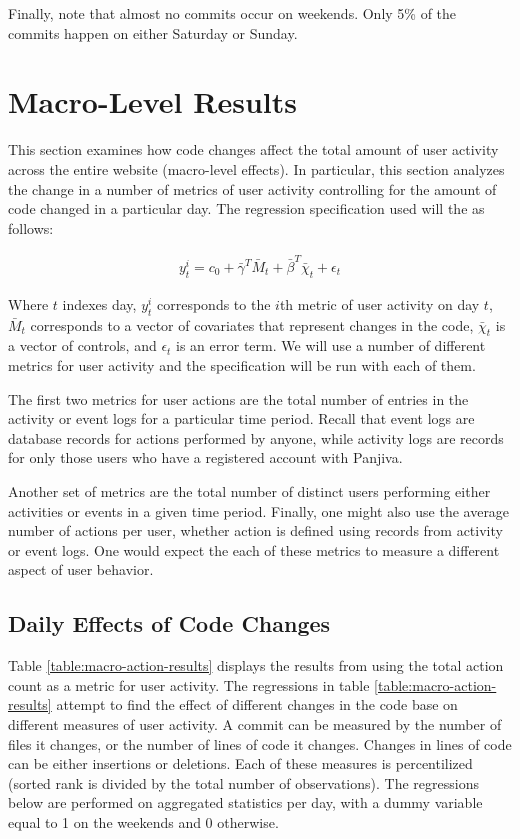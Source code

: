 \documentclass[psamsfonts]{amsart}
\begin{document}
Finally, note that almost no commits occur on weekends. Only 5\% of the commits happen on either Saturday or Sunday.

\section{Macro-Level Results}

This section examines how code changes affect the total amount of user activity across the entire website (macro-level effects). In particular, this section analyzes the change in a number of metrics of user activity controlling for the amount of code changed in a particular day. The regression specification used will the as follows:

\begin{eqnarray}
y^i_{t} = c_0 + \bar{\gamma}^T \bar{M}_t + \bar{\beta}^T \bar{\chi}_t + \epsilon_t
\end{eqnarray}

Where $t$ indexes day, $y^i_t$ corresponds to the $i$th metric of user activity on day $t$, $\bar{M}_t$ corresponds to a vector of covariates that represent changes in the code, $\bar{\chi}_t$ is a vector of controls, and $\epsilon_t$ is an error term. We will use a number of different metrics for user activity and the specification will be run with each of them. 

The first two metrics for user actions are the total number of entries in the activity or event logs for a particular time period. Recall that event logs are database records for actions performed by anyone, while activity logs are records for only those users who have a registered account with Panjiva.

Another set of metrics are the total number of distinct users performing either activities or events in a given time period. Finally, one might also use the average number of actions per user, whether action is defined using records from activity or event logs. One would expect the each of these metrics to measure a different aspect of user behavior. 

\subsection{Daily Effects of Code Changes}

Table \ref{table:macro-action-results} displays the results from using the total action count as a metric for user activity. The regressions in table \ref{table:macro-action-results} attempt to find the effect of different changes in the code base on different measures of user activity. A commit can be measured by the number of files it changes, or the number of lines of code it changes. Changes in lines of code can be either insertions or deletions. Each of these measures is percentilized (sorted rank is divided by the total number of observations). The regressions below are performed on aggregated statistics per day, with a dummy variable equal to 1 on the weekends and 0 otherwise.  
\end{document}
